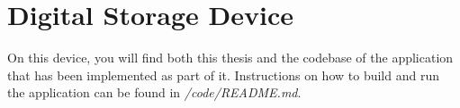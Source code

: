 \chapter*{Digital Storage Device}
\thispagestyle{empty}

On this device, you will find both this thesis and the codebase of the application that has been implemented as part of it. Instructions on how to build and run the application can be found in \textit{/code/README.md}.
